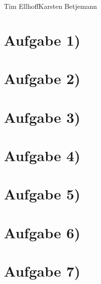 \documentclass{swp1}
\begin{document}
          {Tim Ellhoff}{Karsten Betjemann}{}
          
\section*{Aufgabe 1)}
\section*{Aufgabe 2)}
\section*{Aufgabe 3)}
\section*{Aufgabe 4)}
\section*{Aufgabe 5)}
\section*{Aufgabe 6)}
\section*{Aufgabe 7)}
\end{document}
